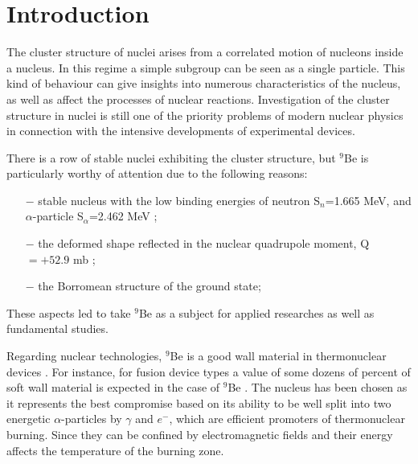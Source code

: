 \documentclass[10pt]{iopart}
\begin{document}
\section{Introduction}
The cluster structure of nuclei arises from a correlated motion of nucleons inside a nucleus. In this regime a simple subgroup can be seen as a single particle. This kind of behaviour can give insights into numerous characteristics of the nucleus, as well as affect the processes of nuclear reactions. Investigation of the cluster structure in nuclei is still one of the priority problems of modern nuclear physics in connection with the intensive developments of experimental devices.

There is a row of stable nuclei exhibiting the cluster structure, but $^9$Be is particularly worthy of attention due to the following reasons: \begin{itemize}
\item[$-$] stable nucleus with the low binding energies of neutron S$_n$=1.665 MeV, and $\alpha$-particle S$_\alpha$=2.462 MeV \cite{separationneutron};
\item[$-$] the deformed shape reflected in the nuclear quadrupole moment, Q$=+52.9 $ mb \cite{quadrupole};
\item[$-$]  the Borromean structure of the ground state;
\end{itemize}
These aspects led to take $^9$Be as a subject for  applied researches as well as fundamental  studies.

Regarding nuclear technologies, $^9$Be is a good wall material in thermonuclear devices \cite{kukulin2010, seksembayev2018}.
For instance, for fusion device types a value of some dozens of percent of soft wall material is expected in the case of $^9$Be \cite{seksembayev2018}.
The nucleus  has been chosen as it represents the best compromise based  on its ability to be well split into two energetic $\alpha$-particles by $\gamma$ and $e^-$, which are efficient promoters of thermonuclear burning. Since they can be confined by electromagnetic fields and their energy affects the temperature of the burning zone.
\end{document}
